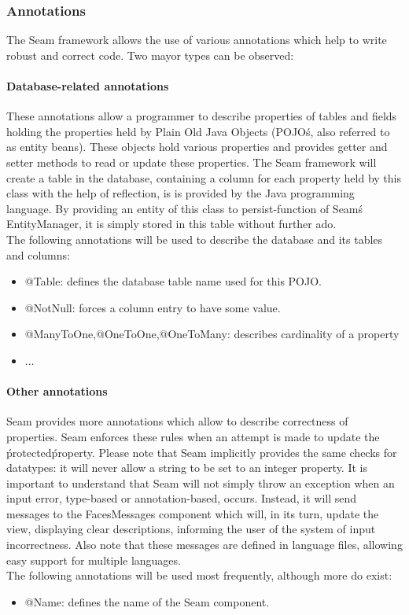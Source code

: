\documentclass[salesmen, twoside]{../../../templates/latex/2009/softproj}
\begin{document}
\begin{projdoc}
\subsubsection{Annotations}
\label{sec_annotations}
The Seam framework allows the use of various annotations which help to write robust and correct code. Two mayor types can be observed:
\paragraph{Database-related annotations}
These annotations allow a programmer to describe properties of tables and fields holding the properties held by Plain Old Java Objects (POJO\'s, also referred to as  entity beans). These objects hold various properties and provides getter and setter methods to read or update these properties. The Seam framework will create a table in the database, containing a column for each property held by this class with the help of reflection, is is provided by the Java programming language. By providing an entity of this class to persist-function of Seam\'s EntityManager, it is simply stored in this table without further ado.\\
The following annotations will be used to describe the database and its tables and columns:
\begin{itemize}
\item @Table: defines the database table name used for this POJO.
\item @NotNull: forces a column entry to have some value.
\item @ManyToOne,@OneToOne,@OneToMany: describes cardinality of a property
\item ...
\end{itemize}

\paragraph{Other annotations}
Seam provides more annotations which allow to describe correctness of properties. Seam enforces these rules when an attempt is made to update the \'protected\' property. Please note that Seam implicitly provides the same checks for datatypes: it will never allow a string to be set to an integer property. It is important to understand that Seam will not simply throw an exception when an input error, type-based or annotation-based, occurs. Instead, it will send messages to the FacesMessages component which will, in its turn, update the view, displaying clear descriptions, informing the user of the system of input incorrectness. Also note that these messages are defined in language files, allowing easy support for multiple languages.\\
The following annotations will be used most frequently, although more do exist:
\begin{itemize}
\item @Name: defines the name of the Seam component.
\end{itemize}


\end{projdoc}
\end{document}
